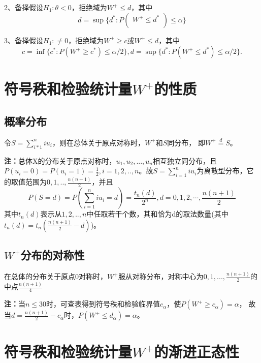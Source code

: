 \documentclass[lang=cn,10pt]{elegantbook}
\begin{document}
2、备择假设$H_1:\theta<0$，拒绝域为$W^+\leq d$，其中
\begin{equation*}
    d=\sup\{d^{*}:P(\begin{array}{c}W^{+}\leq d^{*}\\\end{array})\leq\alpha\}
\end{equation*}

3、备择假设$H_1:\neq 0$，拒绝域为$W^+\geq c$或$W^+\leq d$，其中
\begin{equation*}
    c=\inf\{c^*:P(W^+\geqslant c^*)\leqslant\alpha/2\},
    d=\sup\{d^*:P(W^+\leqslant d^*)\leqslant\alpha/2\}.
\end{equation*}

\section{符号秩和检验统计量$W^+$的性质}
\subsection{概率分布}
\begin{proposition}
    令$S=\sum_{i*1}^niu_i$，则在总体关于原点对称时，$W^+$和$S$同分布，
    即$W^+\overset{d}{\operatorname*{=}}S$。
\end{proposition}
\textbf{注：}总体X的分布关于原点对称时，$u_1,u_2,...,u_n$相互独立同分布，且$P(u_i=0)=P(u_i=1) = \frac12
    ,i=1,2,..,n $。故$S=\sum_{i=1}^{n}iu_i$为离散型分布，它的取值范围为$0,1,..,\frac{n(n+1)}2$，并且
\begin{equation}
    P(S=d)=P(\sum_{i=1}^niu_i=d)=\frac{t_n(d)}{2^n},d=0,1,2,\cdots,\frac{n(n+1)}2
\end{equation}
其中$t_n(d)$表示从$1,2,..,n$中任取若干个数，其和恰为d的取法数量(其中$t_n(d)=t_n(\frac{n(n+1)}{2}-d)$)。

\subsection{$W^+$分布的对称性}
\begin{proposition}
    在总体的分布关于原点0对称时，$W^+$服从对称分布，对称中心为$0,1,...,\frac{n(n+1)}2$的中点$\frac{n(n+1)}4$
\end{proposition}
\textbf{注：}当$n\leq 30$时，可查表得到符号秩和检验临界值$c_\alpha$，使$P(W^+\geq c_\alpha)=\alpha$，
故当$d=\frac{n(n+1)}2-c_\alpha$时，$P(W^+\leq d_\alpha)=\alpha$。

\section{符号秩和检验统计量$W^+$的渐进正态性}
\end{document}

